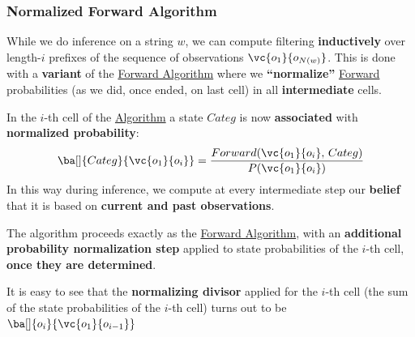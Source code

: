 \subsubsection{Normalized Forward Algorithm}\label{sub:in_normalized_forward_algorithm} %
While we do inference on a string $w$, we can compute filtering \textbf{inductively} over length-$i$ prefixes of the sequence of observations $\vc{o_1}{o_{N(w)}}$.
\emptyln{}
This is done with a \textbf{variant} of the \hyperref[sub:in_forward_algorithm]{Forward Algorithm} where we \textbf{``normalize''} \hyperref[sub:in_forward_algorithm]{Forward} probabilities (as we did, once ended, on last cell) in all \textbf{intermediate} cells.
\begin{remark}{}{}
    In the $i$-th cell of the \hyperref[sub:in_forward_algorithm]{Algorithm} a state $Categ$ is now \textbf{associated} with \textbf{normalized probability}:
    \[
        \ba[]{Categ}{\vc{o_1}{o_i}} = \frac{Forward(\vc{o_1}{o_i},\,Categ)}{P(\vc{o_1}{o_i})}
    \]
    In this way during inference, we compute at every intermediate step our \textbf{belief} that it is based on \textbf{current and past observations}.
\end{remark}
The algorithm proceeds exactly as the \hyperref[sub:in_forward_algorithm]{Forward Algorithm}, with an \textbf{additional probability normalization step} applied to state probabilities of the $i$-th cell, \textbf{once they are determined}.
\begin{note}
    It is easy to see that the \textbf{normalizing divisor} applied for the $i$-th cell (the sum of the state probabilities of the $i$-th cell) turns out to be $\ba[]{o_i}{\vc{o_1}{o_{i-1}}}$
\end{note}
\begin{critical}
\end{critical}
